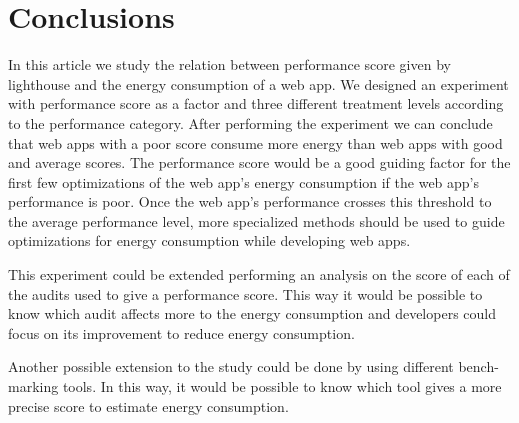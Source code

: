 \section{Conclusions}\label{sec:conclusions}

In this article we study the relation between performance score given by lighthouse and the energy consumption of a web app. We designed an experiment with performance score as a factor and three different treatment levels according to the performance category. After performing the experiment we can conclude that web apps with a poor score consume more energy than web apps with good and average scores. The performance score would be a good guiding factor for the first few optimizations of the web app's energy consumption if the web app's performance is poor. Once the web app's performance crosses this threshold to the average performance level, more specialized methods should be used to guide optimizations for energy consumption while developing web apps. \newline

This experiment could be extended performing an analysis on the score of each of the audits used to give a performance score. This way it would be possible to know which audit affects more to the energy consumption and developers could focus on its improvement to reduce energy consumption. \newline

Another possible extension to the study could be done by using different bench-marking tools. In this way, it would be possible to know which tool gives a more precise score to estimate energy consumption.
